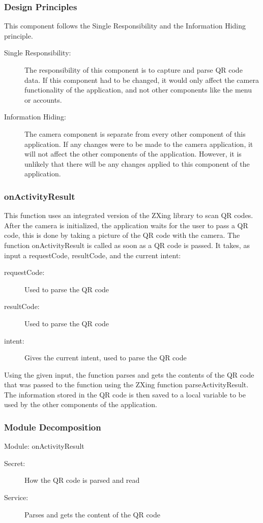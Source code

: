 \documentclass[12pt, titlepage]{article}
\begin{document}
\subsubsection{Design Principles}
This component follows the Single Responsibility and the Information Hiding principle.  

\begin{description}
	\item[Single Responsibility:] The responsibility of this component is to capture and parse QR code data. If this component had to be changed, it would only affect the camera functionality of the application, and not other components like the menu or accounts.
	\item[Information Hiding:] The camera component is separate from every other component of this application. If any changes were to be made to the camera application, it will not affect the other components of the application. However, it is unlikely that there will be any changes applied to this component of the application.
\end{description}

\subsubsection{onActivityResult}
This function uses an integrated version of the ZXing library to scan QR codes. After the camera is initialized, the application waits for the user to pass a QR code, this is done by taking a picture of the QR code with the camera. The function onActivityResult is called as soon as a QR code is passed. It takes, as input a requestCode, resultCode, and the current intent: 

\begin{description}
  \item[requestCode:] Used to parse the QR code 
  \item[resultCode:] Used to parse the QR code 
  \item[intent:] Gives the current intent, used to parse the QR code
\end{description}

Using the given input, the function parses and gets the contents of the QR code that was passed to the function using the ZXing function parseActivityResult. The information stored in the QR code is then saved to a local variable to be used by the other components of the application.

\subsubsection{Module Decomposition}
Module: onActivityResult
\begin{description}
	\item[Secret:]How the QR code is parsed and read
	\item[Service:] Parses and gets the content of the QR code
\end{description}
\end{document}
